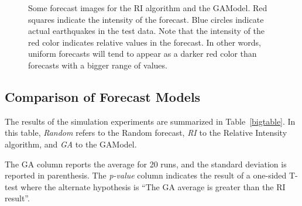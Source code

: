 \documentclass[a4paper,twoside]{article}
\begin{document}
\begin{figure}[P]
\begin{center}
    
  \end{center}
  \caption{Some forecast images for the RI algorithm and the
    GAModel. Red squares indicate the intensity of the forecast. Blue
    circles indicate actual earthquakes in the test data. Note that
    the intensity of the red color indicates relative values in the
    forecast. In other words, uniform forecasts will tend to appear as
    a darker red color than forecasts with a bigger range of values.}
  \label{fig:results}
\end{figure}


\subsection{Comparison of Forecast Models}

The results of the simulation experiments are summarized in
Table~\ref{bigtable}. In this table, \emph{Random} refers to the
Random forecast, \emph{RI} to the Relative Intensity algorithm, and
\emph{GA} to the GAModel. 

The GA column reports the average for 20 runs, and the standard
deviation is reported in parenthesis. The \emph{p-value} column
indicates the result of a one-sided T-test where the alternate
hypothesis is ``The GA average is greater than the RI result''.
\end{document}
